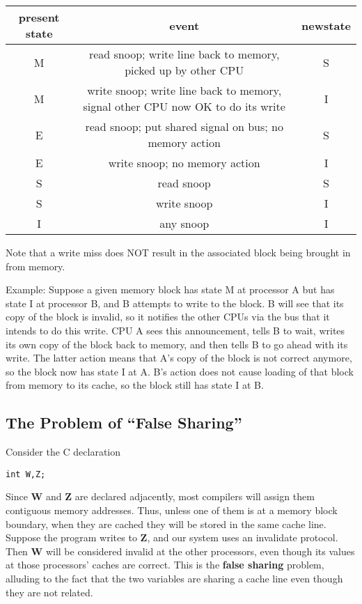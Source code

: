 \begin{tabular}{|c|c|c|}
\hline
present state&
 event&
 newstate\\
\hline
M&
 read snoop; write line back to memory, picked up by other CPU&
 S\\
\hline
M&
 write snoop; write line back to memory, signal other CPU now OK to do its
 write&
 I\\
\hline
E&
 read snoop; put shared signal on bus; no memory action&
 S\\
\hline
E&
 write snoop; no memory action&
 I\\
\hline
S&
 read snoop&
 S\\
\hline
S&
 write snoop&
 I\\
\hline
I&
 any snoop&
 I \\
\hline
\end{tabular}

Note that a write miss does NOT result in the associated block being
brought in from memory.

Example:  Suppose a given memory block has state M at processor A but
has state I at processor B, and B attempts to write to the block.  B
will see that its copy of the block is invalid, so it notifies the other
CPUs via the bus that it intends to do this write.  CPU A sees this
announcement, tells B to wait, writes its own copy of the block
back to memory, and then tells B to go ahead with its write.  The
latter action means that A's copy of the block is not correct anymore,
so the block now has state I at A.  B's action does not cause loading of
that block from memory to its cache, so the block still has state I at
B.

\par{} \vspace{0.3cm}

\subsection{The Problem of ``False Sharing''}

Consider the C declaration

\begin{Verbatim}[fontsize=\relsize{-2}]
int W,Z;
\end{Verbatim}

Since {\bf W} and {\bf Z} are declared adjacently, most compilers will
assign them contiguous memory addresses.  Thus, unless one of them is at
a memory block boundary, when they are cached they will be stored in the
same cache line.  Suppose the program writes to {\bf Z}, and our system
uses an invalidate protocol.  Then {\bf W} will be considered invalid at
the other processors, even though its values at those processors' caches
are correct.  This is the {\bf false sharing} problem, alluding to the
fact that the two variables are sharing a cache line even though they
are not related.

